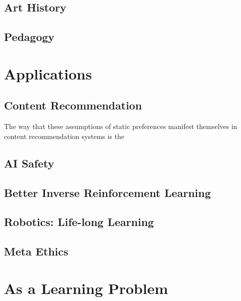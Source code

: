 \documentclass{book}
\begin{document}
	\subsection{Art History}
	\subsection{Pedagogy} %
	\subsection{}
	
	
	\section{Applications}
	
	\subsection{Content Recommendation}
	The way that these assumptions of static preferences manifest themselves in content recommendation systems is the
	
	\subsection{AI Safety}
	\subsection{Better Inverse Reinforcement Learning}
	\subsection{Robotics: Life-long Learning}
	\subsection{Meta Ethics}
	
	\section{As a Learning Problem}
	
	
\end{document}
